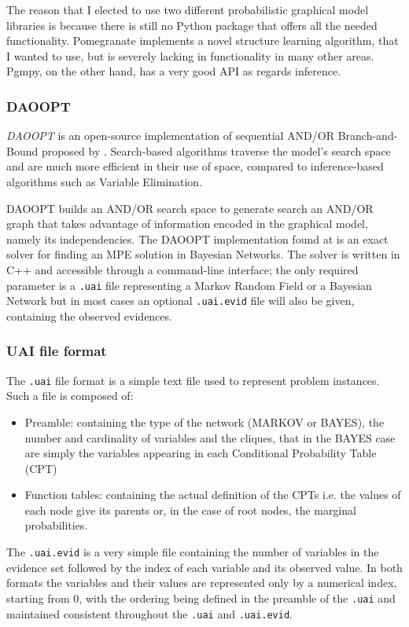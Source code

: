 The reason that I elected to use two different probabilistic graphical model libraries is because there is still no Python package that offers all the needed functionality.
Pomegranate implements a novel structure learning algorithm, that I wanted to use, but is severely lacking in functionality in many other areas.
Pgmpy, on the other hand, has a very good API as regards inference.

\subsubsection{DAOOPT}
\textit{DAOOPT} is an open-source implementation of sequential AND/OR Branch-and-Bound proposed by \cite{Marinescu2006}.
Search-based algorithms traverse the model's search space and are much more efficient in their use of space, compared to inference-based algorithms such as Variable Elimination.

DAOOPT builds an AND/OR search space to generate search an AND/OR graph that takes advantage of information encoded in the graphical model, namely its independencies.
The DAOOPT implementation found at \cite{daoopt} is an exact solver for finding an MPE solution in Bayesian Networks.
The solver is written in C++ and accessible through a command-line interface; the only required parameter is a \texttt{.uai} file representing a Markov Random Field or a Bayesian Network but in most cases an optional \texttt{.uai.evid} file will also be given, containing the observed evidences.

\subsubsection{UAI file format}
The \texttt{.uai} file format is a simple text file used to represent problem instances.
Such a file is composed of:
\begin{itemize}
  \item Preamble: containing the type of the network (MARKOV or BAYES), the number and cardinality of variables and the cliques, that in the BAYES case are simply the variables appearing in each Conditional Probability Table (CPT) 
  \item Function tables: containing the actual definition of the CPTs i.e. the values of each node give its parents or, in the case of root nodes, the marginal probabilities.
\end{itemize}

The \texttt{.uai.evid} is a very simple file containing the number of variables in the evidence set followed by the index of each variable and its observed value.
In both formats the variables and their values are represented only by a numerical index, starting from $0$, with the ordering being defined in the preamble of the \texttt{.uai} and maintained consistent throughout the \texttt{.uai} and \texttt{.uai.evid}.

